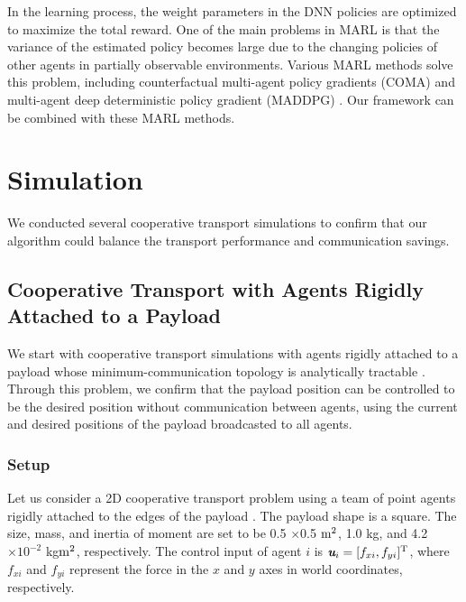 \documentclass[letterpaper, 10 pt, conference]{ieeeconf} %
\begin{document}
In the learning process, the weight parameters in the DNN policies are optimized to maximize the total reward.
One of the main problems in MARL is that the variance of the estimated policy becomes large due to the changing policies of other agents in partially observable environments.
Various MARL methods solve this problem, including counterfactual multi-agent policy gradients (COMA) \cite{Foerster2018} and multi-agent deep deterministic policy gradient (MADDPG) \cite{Lowe2017}. Our framework can be combined with these MARL methods.

\section{Simulation}
We conducted several cooperative transport simulations to confirm that our algorithm could balance the transport performance and communication savings.

\subsection{Cooperative Transport with Agents Rigidly Attached to a Payload}
We start with cooperative transport simulations with agents rigidly attached to a payload whose minimum-communication topology is analytically tractable \cite{Culbertson2018}.
Through this problem, we confirm that the payload position can be controlled to be the desired position without communication between agents, using the current and desired positions of the payload broadcasted to all agents.
\subsubsection{Setup}
Let us consider a 2D cooperative transport problem using a team of point agents rigidly attached to the edges of the payload \cite{Culbertson2018}.
The payload shape is a square. The size, mass, and inertia of moment are set to be 0.5 $\times$0.5 $\rm{}m^2$, 1.0 kg, and 4.2$\times10^{-2}$ kg$\rm{}m^2$, respectively.
The control input of agent $i$ is $\textit{\textbf{u}}_i=[f_{xi}, f_{yi}]^{\rm{T}}$, where $f_{xi}$ and $f_{yi}$ represent the force in the $x$ and $y$ axes in world coordinates, respectively.

\end{document}
